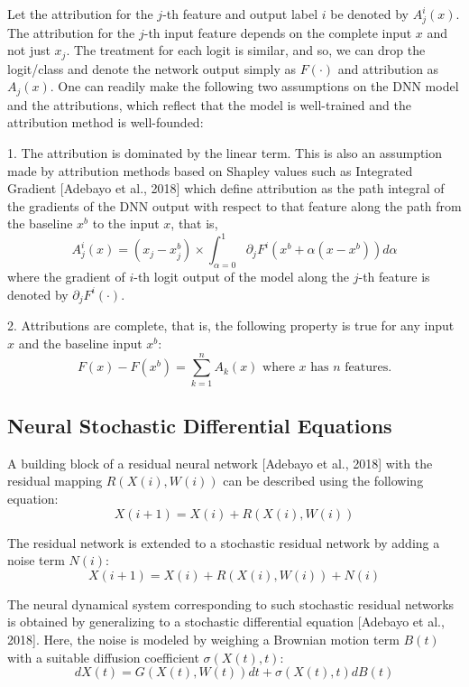 \documentclass[10pt,twocolumn]{article}
\begin{document}
Let the attribution for the $j$-th feature and output label $i$ be denoted by $A^i_j(x)$. The attribution for the $j$-th input feature depends on the complete input $x$ and not just $x_j$. The treatment for each logit is similar, and so, we can drop the logit/class and denote the network output simply as $F(\cdot)$ and attribution as $A_j(x)$. One can readily make the following two assumptions on the DNN model and the attributions, which reflect that the model is well-trained and the attribution method is well-founded:

1. The attribution is dominated by the linear term. This is also an assumption made by attribution methods based on Shapley values such as Integrated Gradient [Adebayo et al., 2018] which define attribution as the path integral of the gradients of the DNN output with respect to that feature along the path from the baseline $x^b$ to the input $x$, that is,
\begin{equation}
A^i_j(x) = (x_j - x^b_j) \times \int^1_{\alpha=0} \partial_j F^i(x^b + \alpha(x - x^b))d\alpha
\end{equation}
where the gradient of $i$-th logit output of the model along the $j$-th feature is denoted by $\partial_j F^i(\cdot)$.

2. Attributions are complete, that is, the following property is true for any input $x$ and the baseline input $x^b$:
\begin{equation}
F(x) - F(x^b) = \sum^n_{k=1} A_k(x) \text{ where } x \text{ has } n \text{ features.}
\end{equation}

\subsection{Neural Stochastic Differential Equations}

A building block of a residual neural network [Adebayo et al., 2018] with the residual mapping $R(X(i), W(i))$ can be described using the following equation:
\begin{equation}
X(i + 1) = X(i) + R(X(i), W(i))
\end{equation}

The residual network is extended to a stochastic residual network by adding a noise term $N(i)$:
\begin{equation}
X(i + 1) = X(i) + R(X(i), W(i)) + N(i)
\end{equation}

The neural dynamical system corresponding to such stochastic residual networks is obtained by generalizing to a stochastic differential equation [Adebayo et al., 2018]. Here, the noise is modeled by weighing a Brownian motion term $B(t)$ with a suitable diffusion coefficient $\sigma(X(t), t)$:
\begin{equation}
dX(t) = G(X(t), W(t)) dt + \sigma(X(t), t) dB(t)
\end{equation}
\end{document}
